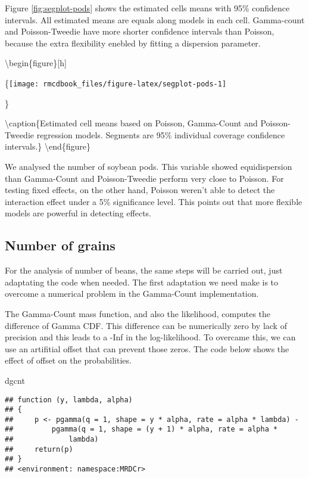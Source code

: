 \documentclass[9pt,a5paper,]{book}
\newenvironment{Shaded}{}{}
\newcommand{\NormalTok}[1]{{#1}}
\renewenvironment{Shaded}{\color{inputcolor}}{}
\theoremstyle{definition}
\theoremstyle{definition}
\theoremstyle{remark}
\begin{document}
Figure \ref{fig:segplot-pods} shows the estimated cells means with 95\%
confidence intervals. All estimated means are equals along models in
each cell. Gamma-count and Poisson-Tweedie have more shorter confidence
intervals than Poisson, because the extra flexibility enebled by fitting
a dispersion parameter.

\textbackslash{}begin\{figure\}{[}h{]}

\{\centering \texttt{[image: rmcdbook\_files/figure-latex/segplot-pods-1]}

\}

\textbackslash{}caption\{Estimated cell means based on Poisson,
Gamma-Count and Poisson-Tweedie regression models. Segments are 95\%
individual coverage confidence intervals.\}\label{fig:segplot-pods}
\textbackslash{}end\{figure\}

We analysed the number of soybean pods. This variable showed
equidispersion than Gamma-Count and Poisson-Tweedie perform very close
to Poisson. For testing fixed effects, on the other hand, Poisson
weren't able to detect the interaction effect under a 5\% significance
level. This points out that more flexible models are powerful in
detecting effects.

\subsection{Number of grains}\label{number-of-grains}

For the analysis of number of beans, the same steps will be carried out,
just adaptating the code when needed. The first adaptation we need make
is to overcome a numerical problem in the Gamma-Count implementation.

The Gamma-Count mass function, and also the likelihood, computes the
difference of Gamma CDF. This difference can be numerically zero by lack
of precision and this leads to a -Inf in the log-likelihood. To overcame
this, we can use an artifitial offset that can prevent those zeros. The
code below shows the effect of offset on the probabilities.

\begin{Shaded}
\begin{Highlighting}[]
\NormalTok{dgcnt}
\end{Highlighting}
\end{Shaded}

\begin{verbatim}
## function (y, lambda, alpha) 
## {
##     p <- pgamma(q = 1, shape = y * alpha, rate = alpha * lambda) - 
##         pgamma(q = 1, shape = (y + 1) * alpha, rate = alpha * 
##             lambda)
##     return(p)
## }
## <environment: namespace:MRDCr>
\end{verbatim}
\end{document}
